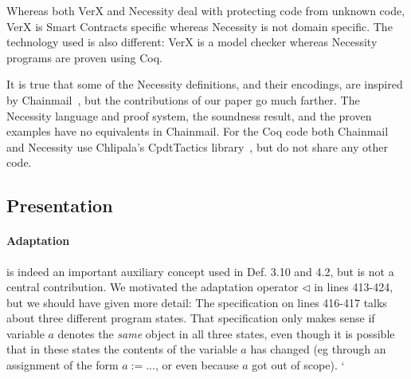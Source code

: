 \documentclass[11pt]{amsart}
\begin{document}
Whereas both VerX and Necessity deal with protecting code from unknown code, VerX is Smart Contracts specific whereas Necessity is not domain specific.  The technology used is also different: VerX is a model checker whereas Necessity programs are proven using Coq.

It is true that some of the Necessity definitions, and their encodings, are inspired by Chainmail~\citep{Drossopoulou}, 
but the contributions of our paper go much farther.
The Necessity language and proof system, 
the soundness result, and the proven examples have no equivalents in Chainmail.
For the Coq code both Chainmail and Necessity use Chlipala's CpdtTactics library~\citep{Chlipala}, but do not share any other code.

\subsection*{Presentation}

\paragraph{\textbf{Adaptation}} is indeed an important auxiliary concept   used in Def. 3.10 and 4.2, but is not a central contribution. 
We motivated the adaptation operator $\triangleleft$  in lines 413-424, but we should have given more detail:
The specification on lines 416-417 talks about 
three different program states. That specification only makes sense if variable $a$ denotes
the \emph{same} object in all three states, even though it is possible that in these states the contents of the variable 
$a$ has changed (eg through an assignment of the form $a:=...$, or even because $a$ got out of scope).
`%
\end{document}
